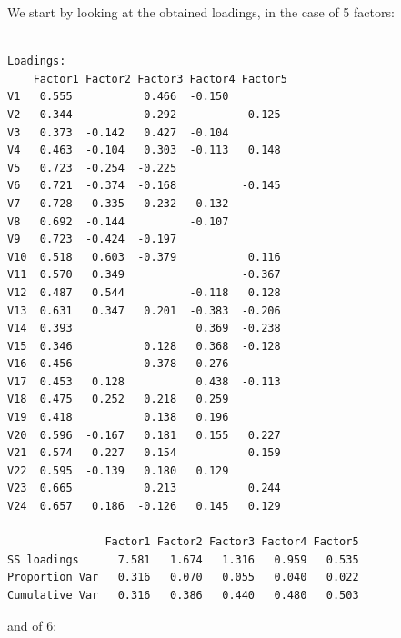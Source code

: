 \documentclass[
  letterpaper,
  DIV=11,
  numbers=noendperiod]{scrartcl}
\newenvironment{Shaded}{\begin{snugshade}}{\end{snugshade}}
\newcommand{\FloatTok}[1]{\textcolor[rgb]{0.68,0.00,0.00}{#1}}
\newcommand{\NormalTok}[1]{\textcolor[rgb]{0.00,0.23,0.31}{#1}}
\newcommand{\OtherTok}[1]{\textcolor[rgb]{0.00,0.23,0.31}{#1}}
\newcommand{\SpecialCharTok}[1]{\textcolor[rgb]{0.37,0.37,0.37}{#1}}
\begin{document}
We start by looking at the obtained loadings, in the case of 5 factors:

\begin{Shaded}
\end{Shaded}

\begin{verbatim}

Loadings:
    Factor1 Factor2 Factor3 Factor4 Factor5
V1   0.555           0.466  -0.150         
V2   0.344           0.292           0.125 
V3   0.373  -0.142   0.427  -0.104         
V4   0.463  -0.104   0.303  -0.113   0.148 
V5   0.723  -0.254  -0.225                 
V6   0.721  -0.374  -0.168          -0.145 
V7   0.728  -0.335  -0.232  -0.132         
V8   0.692  -0.144          -0.107         
V9   0.723  -0.424  -0.197                 
V10  0.518   0.603  -0.379           0.116 
V11  0.570   0.349                  -0.367 
V12  0.487   0.544          -0.118   0.128 
V13  0.631   0.347   0.201  -0.383  -0.206 
V14  0.393                   0.369  -0.238 
V15  0.346           0.128   0.368  -0.128 
V16  0.456           0.378   0.276         
V17  0.453   0.128           0.438  -0.113 
V18  0.475   0.252   0.218   0.259         
V19  0.418           0.138   0.196         
V20  0.596  -0.167   0.181   0.155   0.227 
V21  0.574   0.227   0.154           0.159 
V22  0.595  -0.139   0.180   0.129         
V23  0.665           0.213           0.244 
V24  0.657   0.186  -0.126   0.145   0.129 

               Factor1 Factor2 Factor3 Factor4 Factor5
SS loadings      7.581   1.674   1.316   0.959   0.535
Proportion Var   0.316   0.070   0.055   0.040   0.022
Cumulative Var   0.316   0.386   0.440   0.480   0.503
\end{verbatim}

and of 6:

\begin{Shaded}
\end{Shaded}
\end{document}
